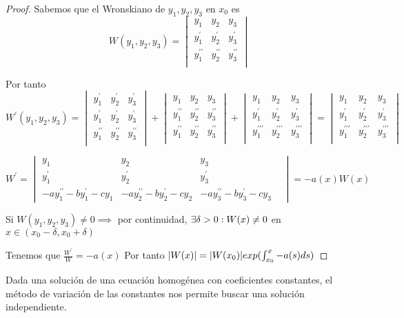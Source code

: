 \documentclass{mathnotes}
\begin{document}
\begin{proof}
Sabemos que el Wronskiano de $y_1, y_2, y_3$ en $x_0$ es
$$W(y_1, y_2, y_3) = \begin{vmatrix}
y_1& y_2& y_3\\
y_1^{\prime}& y_2^{\prime}& y_3^{\prime}\\
y_1^{\prime\prime}& y_2^{\prime\prime}& y_3^{\prime\prime}\\
\end{vmatrix}$$

Por tanto
$$W^\prime(y_1,y_2,y_3) = \begin{vmatrix}
y_1^\prime& y_2^\prime& y_3^\prime\\
y_1^{\prime}& y_2^{\prime}& y_3^{\prime}\\
y_1^{\prime\prime}& y_2^{\prime\prime}& y_3^{\prime\prime}\\
\end{vmatrix} + \begin{vmatrix}
y_1& y_2& y_3\\
y_1^{\prime\prime}& y_2^{\prime\prime}& y_3^{\prime\prime}\\
y_1^{\prime\prime}& y_2^{\prime\prime}& y_3^{\prime\prime}\\
\end{vmatrix} + \begin{vmatrix}
y_1& y_2& y_3\\
y_1^{\prime}& y_2^{\prime}& y_3^{\prime}\\
y_1^{\prime\prime\prime}& y_2^{\prime\prime\prime}& y_3^{\prime\prime\prime}\\
\end{vmatrix} = \begin{vmatrix}
y_1& y_2& y_3\\
y_1^{\prime}& y_2^{\prime}& y_3^{\prime}\\
y_1^{\prime\prime\prime}& y_2^{\prime\prime\prime}& y_3^{\prime\prime\prime}\\
\end{vmatrix}$$

$$W^\prime = \begin{vmatrix}
y_1& y_2& y_3\\
y_1^\prime& y_2^\prime& y_3^\prime\\
-ay^{\prime\prime}_1-by^\prime_1-cy_1&
-ay^{\prime\prime}_2-by^\prime_2-cy_2&
-ay^{\prime\prime}_3-by^\prime_3-cy_3&
\end{vmatrix} = -a(x)W(x)$$

Si $W(y_1,y_2,y_3) \neq 0 \implies$ por continuidad, $\exists \delta > 0 : W(x) \neq 0$ en $x\in (x_0-\delta, x_0+\delta)$

Tenemos que $\frac{W^\prime}{W}=-a(x)$
Por tanto $|W(x)| = |W(x_0)|exp(\int_{x_0}^x -a(s)ds)$
\end{proof}
\vspace{5mm}
\obs
Dada una solución de una ecuación homogénea con coeficientes constantes, el método de variación de las constantes nos permite buscar una solución independiente.
\end{document}
